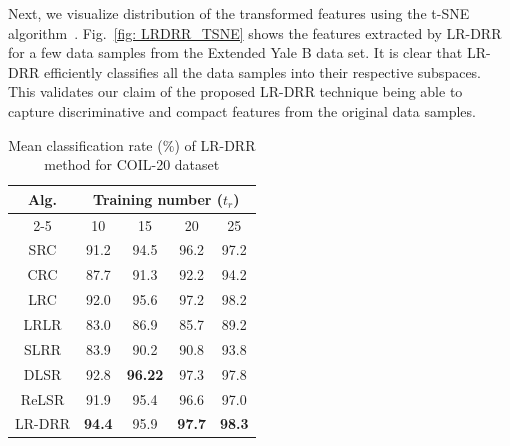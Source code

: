 Next, we visualize distribution of the transformed features using the t-SNE algorithm~\cite{TSNE}. Fig.~\ref{fig: LRDRR_TSNE} shows the features extracted by LR-DRR for a few data samples from the Extended Yale B data set. It is clear that LR-DRR efficiently classifies all the data samples into their respective subspaces. This validates our claim of the proposed LR-DRR technique being able to capture discriminative and compact features from the original data samples.
%
\begin{table}
\caption{Mean classification rate ($\%$) of LR-DRR method for COIL-20 dataset}
\label{table: LRDRR_Accuracy_Coil_dataset}
\centering
\begin{tabular}{|c|cccc|}
\hline
\multirow{2}{*}{Alg.} & \multicolumn{4}{c|}{Training number ($t_r$)}                                                                                  \\ \cline{2-5} 
                      & \multicolumn{1}{c|}{10}            & \multicolumn{1}{c|}{15}             & \multicolumn{1}{c|}{20}            & 25            \\ \hline
SRC                   & \multicolumn{1}{c|}{91.2}          & \multicolumn{1}{c|}{94.5}           & \multicolumn{1}{c|}{96.2}          & 97.2          \\ \hline
CRC                   & \multicolumn{1}{c|}{87.7}          & \multicolumn{1}{c|}{91.3}           & \multicolumn{1}{c|}{92.2}          & 94.2          \\ \hline
LRC                   & \multicolumn{1}{c|}{92.0}          & \multicolumn{1}{c|}{95.6}           & \multicolumn{1}{c|}{97.2}          & 98.2          \\ \hline
LRLR                  & \multicolumn{1}{c|}{83.0}          & \multicolumn{1}{c|}{86.9}           & \multicolumn{1}{c|}{85.7}          & 89.2          \\ \hline
SLRR                  & \multicolumn{1}{c|}{83.9}          & \multicolumn{1}{c|}{90.2}           & \multicolumn{1}{c|}{90.8}          & 93.8          \\ \hline
DLSR                  & \multicolumn{1}{c|}{92.8}          & \multicolumn{1}{c|}{\textbf{96.22}} & \multicolumn{1}{c|}{97.3}          & 97.8          \\ \hline
ReLSR                 & \multicolumn{1}{c|}{91.9}          & \multicolumn{1}{c|}{95.4}           & \multicolumn{1}{c|}{96.6}          & 97.0          \\ \hline
LR-DRR                & \multicolumn{1}{c|}{\textbf{94.4}} & \multicolumn{1}{c|}{95.9}           & \multicolumn{1}{c|}{\textbf{97.7}} & \textbf{98.3} \\ \hline
\end{tabular}
\end{table}

